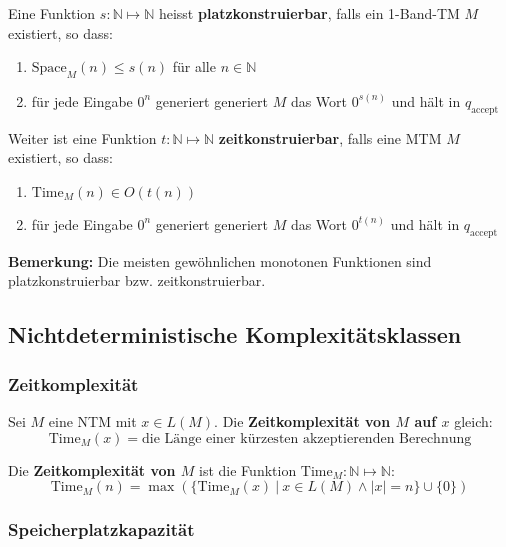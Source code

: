 \documentclass[11pt]{article}
\newcommand{\ttc}{\text{Time}}
\newcommand{\tsc}{\text{Space}}
\begin{document}
Eine Funktion $s: \mathbb{N} \mapsto \mathbb{N}$ heisst \textbf{platzkonstruierbar}, falls ein 1-Band-TM $M$ existiert, so dass:
\begin{enumerate}[label=(\roman*), noitemsep]
	\item $\tsc_M(n) \leq s(n)$ f{\"u}r alle $n \in \mathbb{N}$
	\item f{\"u}r jede Eingabe $0^n$ generiert generiert $M$ das Wort $0^{s(n)}$ und h{\"a}lt in $q_\text{accept}$
\end{enumerate}

Weiter ist eine Funktion $t: \mathbb{N} \mapsto \mathbb{N}$ \textbf{zeitkonstruierbar}, falls eine MTM $M$ existiert, so dass:
\begin{enumerate}[label=(\roman*), noitemsep]
	\item $\ttc_M(n) \in O(t(n))$
	\item f{\"u}r jede Eingabe $0^n$ generiert generiert $M$ das Wort $0^{t(n)}$ und h{\"a}lt in $q_\text{accept}$
\end{enumerate}

\textbf{Bemerkung:} Die meisten gew{\"o}hnlichen monotonen Funktionen sind platzkonstruierbar bzw. zeitkonstruierbar. \\

\subsection{Nichtdeterministische Komplexit{\"a}tsklassen}

\subsubsection{Zeitkomplexit{\"a}t}

Sei $M$ eine NTM mit $x \in L(M)$. Die \textbf{Zeitkomplexit{\"a}t von $M$ auf $x$} gleich:
\begin{equation*}
	\ttc_M(x) = \text{die L{\"a}nge einer k{\"u}rzesten akzeptierenden Berechnung}
\end{equation*}

Die \textbf{Zeitkomplexit{\"a}t von $M$} ist die Funktion $\ttc_M: \mathbb{N} \mapsto \mathbb{N}$:
\begin{equation*}
	\ttc_M(n) = \max(\{\ttc_M(x)\ |\ x \in L(M) \land |x| = n\} \cup \{0\})
\end{equation*}

\subsubsection{Speicherplatzkapazit{\"a}t}
\end{document}
